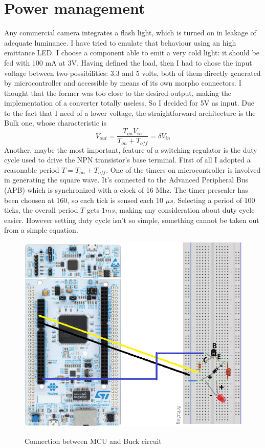 \section{Power management}
Any commercial camera integrates a flash light, which is turned on in leakage of adequate luminance. I have tried to emulate that behaviour using an high emittance LED. I choose a component able to emit a very cold light: it should be fed with 100 mA at 3V. Having defined the load, then I had to chose the input voltage between two possibilities: 3.3 and 5 volts, both of them directly generated by microcontroller and accessible by means of its own morpho connectors. I thought that the former was too close to the desired output, making the implementation of a converter totally useless. So I decided for 5V as input. Due to the fact that I need of a lower voltage, the straightforward architecture is the Bulk one, whose characteristic is
\begin{equation*}
V_{out} = \dfrac{T_{on}V_{in}}{T_{on}+T_{off}} = \delta V_{in}
\end{equation*}
Another, maybe the most important, feature of a switching regulator is the duty cycle used to drive the NPN transistor's base terminal. First of all I adopted a reasonable period $T = T_{on} + T_{off}$. One of the timers on microcontroller is involved in generating the square wave. It's connected to the Advanced Peripheral Bus (APB) which is synchronized with a clock of 16 Mhz. The timer prescaler has been choosen at 160, so each tick is sensed each 10 $\mu s$. Selecting a period of 100 ticks, the overall period $T$ gets $1 ms$, making any consideration about duty cycle easier. However setting duty cycle isn't so simple, something cannot be taken out from a simple equation.
\begin{figure}[H]
\centering
\includegraphics{Immagini/13}
\label{13}
\caption{Connection between MCU and Buck circuit}
\end{figure}

